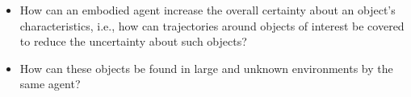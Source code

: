 \begin{itemize}
      \item How can an embodied agent increase the overall certainty about an object's characteristics, i.e., how can trajectories around objects of interest be covered to reduce the uncertainty about such objects? 
      \item How can these objects be found in large and unknown environments by the same agent?
\end{itemize}